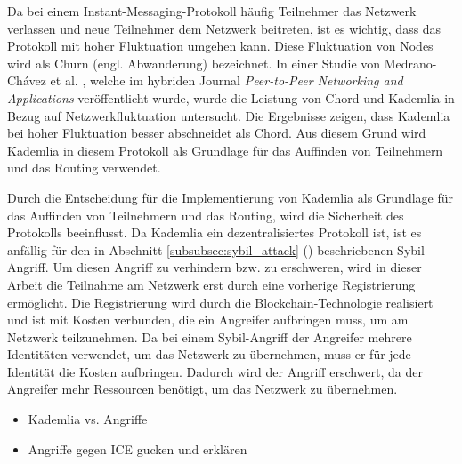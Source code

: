 \noindent Da bei einem Instant-Messaging-Protokoll häufig Teilnehmer das Netzwerk verlassen und neue Teilnehmer dem Netzwerk beitreten, ist es wichtig, dass das Protokoll mit hoher Fluktuation umgehen kann. Diese Fluktuation von Nodes wird als Churn (engl. Abwanderung) bezeichnet. In einer Studie von Medrano-Chávez et al. \parencite{MedranoChavez_ChordKademliaHighChurnScenarios}, welche im hybriden Journal \textit{Peer-to-Peer Networking and Applications} veröffentlicht wurde, wurde die Leistung von Chord und Kademlia in Bezug auf Netzwerkfluktuation untersucht. Die Ergebnisse zeigen, dass Kademlia bei hoher Fluktuation besser abschneidet als Chord. Aus diesem Grund wird Kademlia in diesem Protokoll als Grundlage für das Auffinden von Teilnehmern und das Routing verwendet.


Durch die Entscheidung für die Implementierung von Kademlia als Grundlage für das Auffinden von Teilnehmern und das Routing, wird die Sicherheit des Protokolls beeinflusst. Da Kademlia ein dezentralisiertes Protokoll ist, ist es anfällig für den in Abschnitt \ref{subsubsec:sybil_attack} (\textit{}) beschriebenen Sybil-Angriff. Um diesen Angriff zu verhindern bzw. zu erschweren, wird in dieser Arbeit die Teilnahme am Netzwerk erst durch eine vorherige Registrierung ermöglicht. Die Registrierung wird durch die Blockchain-Technologie realisiert und ist mit Kosten verbunden, die ein Angreifer aufbringen muss, um am Netzwerk teilzunehmen. Da bei einem Sybil-Angriff der Angreifer mehrere Identitäten verwendet, um das Netzwerk zu übernehmen, muss er für jede Identität die Kosten aufbringen. Dadurch wird der Angriff erschwert, da der Angreifer mehr Ressourcen benötigt, um das Netzwerk zu übernehmen.







\begin{itemize}
    \item Kademlia vs. Angriffe
    \item Angriffe gegen ICE gucken und erklären
\end{itemize}

